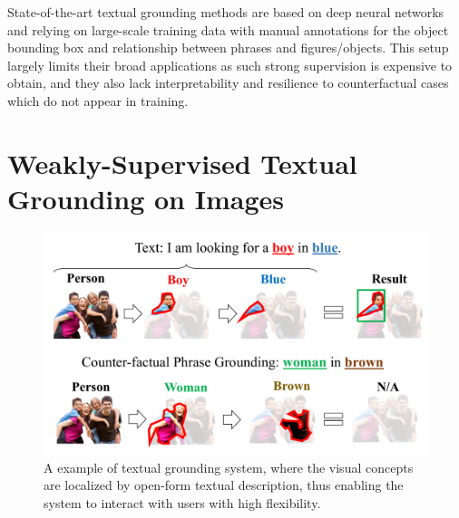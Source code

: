 State-of-the-art textual grounding methods \citep{yu2018mattnet, hu2016natural, rohrbach2016grounding, plummer2015flickr30k, yeh2017interpretable, luo2017comprehension, fang2018weakly} are based on deep neural networks and relying on
large-scale training data with manual annotations for the object bounding box and relationship between
phrases and figures/objects.
This setup largely limits their broad applications as such strong supervision is expensive to obtain,
and they also lack interpretability and resilience to counterfactual cases which do not appear in training.




\section{Weakly-Supervised Textual Grounding on Images}

\begin{figure}[h]
  \begin{center}
    \includegraphics[width=1.0\textwidth]{images/mtg_abstract.pdf}
  \end{center}
  \caption{A example of textual grounding system, where the visual concepts are localized by open-form textual description, thus enabling the system to interact with users with high flexibility.}
  \label{fig:grounding}
 \end{figure}

